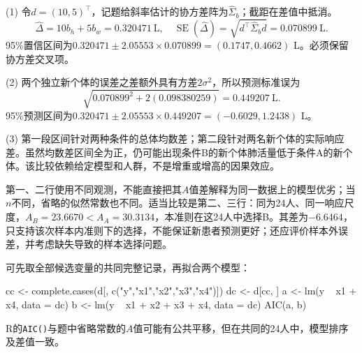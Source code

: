 (1) 令$d=(10,5)^\top$，记题给斜率估计的协方差阵为$\widehat\Sigma_b$；截距在差值中抵消。\[\widehat\Delta=10b_h+5b_w=0.320471\ \mathrm L,\quad\operatorname{SE}(\widehat\Delta)=\sqrt{d^\top\widehat\Sigma_b d}=0.070899\ \mathrm L.\]95\%置信区间为$0.320471\pm2.05553\times0.070899=(0.1747,0.4662)$ L。必须保留协方差交叉项。\par (2) 两个独立新个体的误差之差额外具有方差$2\sigma^2$，所以预测标准误为\[\sqrt{0.070899^2+2(0.098380259)}=0.449207\ \mathrm L.\]95\%预测区间为$0.320471\pm2.05553\times0.449207=(-0.6029,1.2438)$ L。\par (3) 第一段区间针对两种条件的总体均数差；第二段针对两名新个体的实际响应差。虽然均数差区间全为正，仍可能出现条件B的新个体肺活量低于条件A的新个体。该比较依赖给定模型和人群，不是增重或增高的因果效应。
\par\nobreak\smallskip{}

第一、二行使用不同观测，不能直接把其$A$值差解释为同一数据上的模型优劣；当$n$不同，省略的似然常数也不同。适当比较是第二、三行：同为24人、同一响应尺度，$A_B=23.6670<A_A=30.3134$，本准则在这24人中选择B。其差为$-6.6464$，只支持该次样本内准则下的选择，不能保证新患者预测更好；还应评价样本外误差，并考虑缺失导致的样本选择问题。\par 可先取全部候选变量的共同完整记录，再拟合两个模型：
\begin{rcode}
cc <- complete.cases(d[, c("y","x1","x2","x3","x4")])
dc <- d[cc, ]
a <- lm(y ~ x1 + x4, data = dc)
b <- lm(y ~ x1 + x2 + x3 + x4, data = dc)
AIC(a, b)
\end{rcode}
R的\texttt{AIC()}与题中省略常数的$A$值可能有公共平移，但在共同的24人中，模型排序及差值一致。
\par\nobreak\smallskip{}
